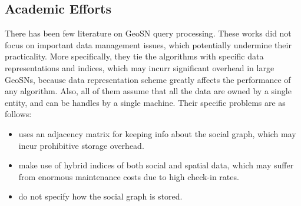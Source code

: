 \subsection{Academic Efforts}
There has been few literature on GeoSN query processing\cite{amir2007buddy,yiu2010efficient,khoshgozaran2009private,scellato2010distance}. These works did not focus on important data management issues, which potentially undermine their practicality. More specifically, they tie the algorithms with specific data representations and indices, which may incurr significant overhead in large GeoSNs, because data representation scheme greatly affects the performance of any algorithm. Also, all of them assume that all the data are owned by a single entity, and can be handles by a single machine. Their specific problems are as follows:
\begin{itemize}
	\item\cite{khoshgozaran2009private} uses an adjacency matrix for keeping info about the social graph, which may incur prohibitive storage overhead. 
	\item\cite{amir2007buddy,scellato2010distance} make use of hybrid indices of both social and spatial data, which may suffer from enormous maintenance costs due to high check-in rates. 
	\item\cite{yiu2010efficient,scellato2010distance} do not specify how the social graph is stored. 
\end{itemize}


